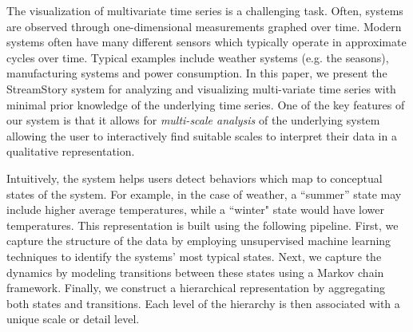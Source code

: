The visualization of multivariate time series is a challenging task. Often, systems are observed through one-dimensional measurements graphed over time. Modern systems often have many different sensors which 
typically operate in approximate cycles over time. Typical examples include weather systems (e.g. the seasons), manufacturing systems and power consumption. 
%
In this paper, we  present the StreamStory system for analyzing and visualizing multi-variate time series with minimal prior knowledge of the underlying time series. One of the key features of our system is that it allows for  \emph{multi-scale analysis} of the underlying system allowing the user to interactively find suitable scales to interpret their data in a qualitative representation.  

Intuitively, the system helps users detect behaviors which map to conceptual states of the system. For example, in the case of weather, a ``summer'' state may include higher average temperatures, while a ``winter" state would have lower temperatures. 
%
This representation is built using the following pipeline. First, we capture the structure of the data by employing unsupervised machine learning
techniques to identify the systems' most typical states. Next, we capture the
dynamics by modeling transitions between these states using a Markov chain framework.
Finally, we construct a hierarchical representation by aggregating both
states and transitions. Each level of the hierarchy is then associated with a unique
scale or detail level.

